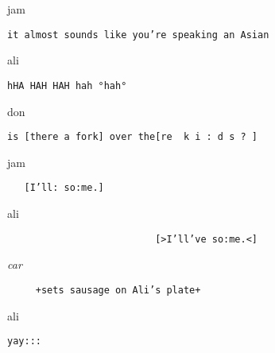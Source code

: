 \documentclass[output=paper,nonflat,modfont,draft]{langsci/langscibook}
\begin{document}

\begin{transbox}{5}{jam}
\begin{verbatim}
it almost sounds like you’re speaking an Asian
\end{verbatim}
\end{transbox}


\begin{transbox}{7}{ali}
\begin{verbatim}
hHA HAH HAH hah °hah°
\end{verbatim}
\end{transbox}

\begin{mdframedkendrick}[style=firstfoc]
\begin{transbox}{8}{don}
\begin{verbatim}
is [there a fork] over the[re  k i : d s ? ]
\end{verbatim}
\end{transbox}
\end{mdframedkendrick}\vspace{-5mm}

\begin{transbox}{9}{jam}
\begin{verbatim}
   [I’ll: so:me.]
\end{verbatim}
\end{transbox}

\begin{transbox}{10}{ali}
\begin{verbatim}
                          [>I’ll’ve so:me.<]
\end{verbatim}
\end{transbox}


\begin{transbox}{12}{\textit{car}}
\begin{verbatim}
     +sets sausage on Ali’s plate+
\end{verbatim}
\end{transbox}

\begin{transbox}{13}{ali}
\begin{verbatim}
yay:::
\end{verbatim}
\end{transbox}

\end{document}
